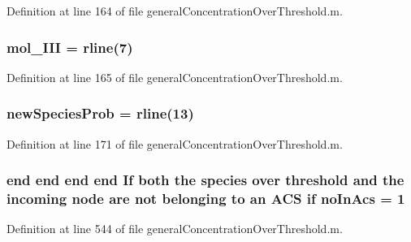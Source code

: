 Definition at line 164 of file general\-Concentration\-Over\-Threshold.\-m.

\hypertarget{a00022_adf61c91ad9a34233b3fe493e21f8969e}{
\subsubsection[{mol\-\_\-\-I\-I\-I}]{\setlength{\rightskip}{0pt plus 5cm}mol\-\_\-\-I\-I\-I = {\bf rline}(7)}}\label{a00022_adf61c91ad9a34233b3fe493e21f8969e}


Definition at line 165 of file general\-Concentration\-Over\-Threshold.\-m.

\hypertarget{a00022_aa66147edba72bc0b9cf591cd7475396f}{
\subsubsection[{new\-Species\-Prob}]{\setlength{\rightskip}{0pt plus 5cm}new\-Species\-Prob = {\bf rline}(13)}}\label{a00022_aa66147edba72bc0b9cf591cd7475396f}


Definition at line 171 of file general\-Concentration\-Over\-Threshold.\-m.

\hypertarget{a00022_ac45b9c97670e4b4e103ce174dc2db6b3}{
\subsubsection[{no\-In\-Acs}]{ {\bf end} {\bf end} {\bf end} {\bf end} If both the {\bf species} over {\bf threshold} {\bf and} the incoming node are not belonging {\bf to} an {\bf A\-C\-S} {\bf if} no\-In\-Acs = 1}}\label{a00022_ac45b9c97670e4b4e103ce174dc2db6b3}


Definition at line 544 of file general\-Concentration\-Over\-Threshold.\-m.

